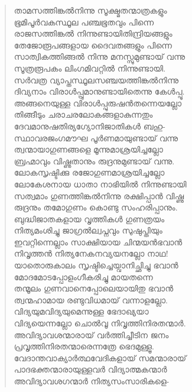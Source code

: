 \begin{verse}
താമസത്തിങ്കല്‍നിന്നു സൂക്ഷ്മതന്മാത്രകളും\\
ഭൂമിപൂര്‍വകസ്ഥൂല പഞ്ചഭൂതവും പിന്നെ\\
രാജസത്തിങ്കല്‍ നിന്നുണ്ടായിതിന്ദ്രിയങ്ങളും\\
തേജോരൂപങ്ങളായ ദൈവതങ്ങളും പിന്നെ\\
സാത്വികത്തിങ്ങല്‍ നിന്നു മനസ്സുമുണ്ടായ് വന്നു\\
സൂത്രരൂപകം ലിംഗമിവറ്റില്‍ നിന്നുണ്ടായി.\\
സര്‍വത്ര വ്യാപ്തസ്ഥൂലസഞ്ചയത്തിങ്കല്‍നിന്നു\\
ദിവ്യനാം വിരാള്‍പ്പ്രുമാനുണ്ടായിതെന്നു കേള്‍പ്പൂ.\\
അങ്ങനെയുള്ള വിരാള്‍പ്പുരുഷന്‍തന്നെയല്ലോ\\
തിങ്ങീടും ചരാചരലോകങ്ങളാകുന്നതും\\
ദേവമാനുഷതിര്യഗ്യോനിജാതികള്‍ ബഹു-\\
സ്ഥാവരജംഗമൗഘ പൂര്‍ണമായുണ്ടായ് വന്നു\\
ത്വന്മായാഗുണങ്ങളെ മൂന്നുമാശ്രയിച്ചല്ലോ\\
ബ്രഹ്മാവും വിഷ്ണുതാനും രുദ്രനുമുണ്ടായ് വന്നു.\\
ലോകസൃഷ്ടിക്കു രജോഗുണമാശ്രയിച്ചല്ലോ\\
ലോകേശനായ ധാതാ നാഭിയില്‍ നിന്നുണ്ടായി\\
സത്വമാം ഗുണത്തിങ്കല്‍നിന്നു രക്ഷിപ്പാന്‍ വിഷ്ണു\\
രുദ്രനും തമോഗുണം കൊണ്ടു സംഹരിപ്പാനും.\\
ബുദ്ധിജാതകളായ വൃത്തികള്‍ ഗുണത്രയം\\
നിത്യമംശിച്ചു ജാഗ്രല്‍ല്വപ്നവും സുഷുപ്തിയും\\
ഇവറ്റിന്നെല്ലാം സാക്ഷിയായ ചിന്മയന്‍ഭവാന്‍\\
നിവൃത്തന്‍ നിത്യനേകനവ്യയനല്ലോ നാഥ!\\
യാതൊരുകാലം സൃഷ്ടിച്ചെയ്വാനിച്ഛിച്ചു ഭവാന്‍\\
മോദമോടപ്പോളംഗീകരിച്ചു മായതന്നെ\\
തന്മൂലം ഗുണവാനെപ്പോലെയായിതു ഭവാന്‍\\
ത്വന്മഹാമായ രണ്ടുവിധമായ് വന്നാളല്ലോ.\\
വിദ്യയുമവിദ്യയുമെന്നുള്ള ഭേദാഖ്യയാ\\
വിദ്യയെന്നല്ലോ ചൊല്‍വൂ നിവൃത്തിനിരതന്മാര്‍.\\
അവിദ്യാവശന്മാരായ് വര്‍ത്തിച്ചീടിന ജനം\\
പ്രവൃത്തിനിരതന്മാരെന്നത്രേ ഭെദമുള്ളൂ.\\
വേദാന്തവാക്യാര്‍ത്ഥവേദികളായ് സമന്മാരായ്\\
പാദഭക്തന്മാരായുള്ളവര്‍ വിദ്യാത്മകന്മാര്‍\\
അവിദ്യാവശഗന്മാര്‍ നിത്യസംസാരികളെ-\\

\end{verse}
